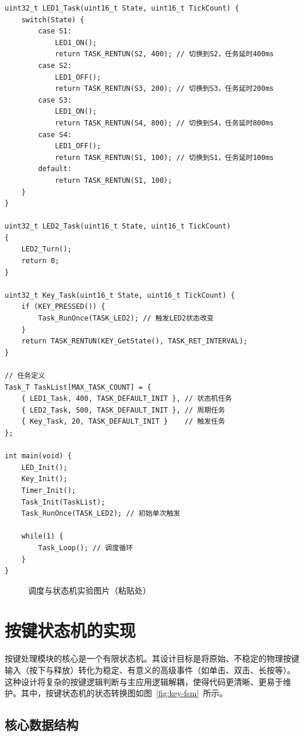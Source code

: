 \begin{lstlisting}[style=c]
uint32_t LED1_Task(uint16_t State, uint16_t TickCount) {
    switch(State) {
        case S1:
            LED1_ON();
            return TASK_RENTUN(S2, 400); // 切换到S2，任务延时400ms
        case S2:
            LED1_OFF();
            return TASK_RENTUN(S3, 200); // 切换到S3，任务延时200ms
        case S3:
            LED1_ON();
            return TASK_RENTUN(S4, 800); // 切换到S4，任务延时800ms
        case S4:
            LED1_OFF();
            return TASK_RENTUN(S1, 100); // 切换到S1，任务延时100ms
        default:
            return TASK_RENTUN(S1, 100);
    }
}

uint32_t LED2_Task(uint16_t State, uint16_t TickCount)
{
    LED2_Turn();
    return 0;
}

uint32_t Key_Task(uint16_t State, uint16_t TickCount) {
    if (KEY_PRESSED()) {
        Task_RunOnce(TASK_LED2); // 触发LED2状态改变
    }
    return TASK_RENTUN(KEY_GetState(), TASK_RET_INTERVAL);
}

// 任务定义
Task_T TaskList[MAX_TASK_COUNT] = {
    { LED1_Task, 400, TASK_DEFAULT_INIT }, // 状态机任务
    { LED2_Task, 500, TASK_DEFAULT_INIT }, // 周期任务
    { Key_Task, 20, TASK_DEFAULT_INIT }    // 触发任务
};

int main(void) {
    LED_Init();
    Key_Init();
    Timer_Init();
    Task_Init(TaskList);
    Task_RunOnce(TASK_LED2); // 初始单次触发

    while(1) {
        Task_Loop(); // 调度循环
    }
}
\end{lstlisting}

\begin{figure}[htbp]
\centering
    \fbox{\rule{0pt}{5cm}\rule{0.8\linewidth}{0pt}}
\caption{调度与状态机实验图片（粘贴处）} \label{fig:ch2-placeholder}
\end{figure}
\section{按键状态机的实现}

按键处理模块的核心是一个有限状态机。其设计目标是将原始、不稳定的物理按键输入（按下与释放）转化为稳定、有意义的高级事件（如单击、双击、长按等）。这种设计将复杂的按键逻辑判断与主应用逻辑解耦，使得代码更清晰、更易于维护。其中，按键状态机的状态转换图如图~\ref{fig:key-fsm}~所示。

\subsection{核心数据结构}

